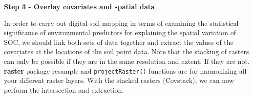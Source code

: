 \documentclass[10pt,b5paper,]{book}
\newenvironment{Shaded}{\begin{snugshade}}{\end{snugshade}}
\newcommand{\CommentTok}[1]{\textcolor[rgb]{0.56,0.35,0.01}{\textit{#1}}}
\newcommand{\DataTypeTok}[1]{\textcolor[rgb]{0.13,0.29,0.53}{#1}}
\newcommand{\ErrorTok}[1]{\textcolor[rgb]{0.64,0.00,0.00}{\textbf{#1}}}
\newcommand{\KeywordTok}[1]{\textcolor[rgb]{0.13,0.29,0.53}{\textbf{#1}}}
\newcommand{\NormalTok}[1]{#1}
\newcommand{\OperatorTok}[1]{\textcolor[rgb]{0.81,0.36,0.00}{\textbf{#1}}}
\newcommand{\OtherTok}[1]{\textcolor[rgb]{0.56,0.35,0.01}{#1}}
\newcommand{\StringTok}[1]{\textcolor[rgb]{0.31,0.60,0.02}{#1}}
\theoremstyle{definition}
\theoremstyle{definition}
\theoremstyle{definition}
\theoremstyle{remark}
\begin{document}
\textbf{Step 3 - Overlay covariates and spatial data}

In order to carry out digital soil mapping in terms of examining the
statistical significance of environmental predictors for explaining the
spatial variation of SOC, we should link both sets of data together and
extract the values of the covariates at the locations of the soil point
data. Note that the stacking of rasters can only be possible if they are
in the same resolution and extent. If they are not, \textbf{raster}
package resample and \texttt{projectRaster()} functions are for
harmonizing all your different raster layers. With the stacked rasters
(Covstack), we can now perform the intersection and extraction.

\begin{Shaded}
\end{Shaded}
\end{document}
